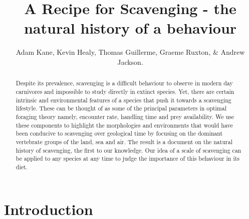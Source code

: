 \documentclass[a4paper,12pt]{article}
\title{A Recipe for Scavenging - the natural history of a behaviour}
\author{Adam Kane, Kevin Healy, Thomas Guillerme, Graeme Ruxton, \& Andrew Jackson.}
\begin{document}
\maketitle


\begin{abstract} 
Despite its prevalence, scavenging is a difficult behaviour to observe in modern day carnivores and impossible to study directly in extinct species. 
Yet, there are certain intrinsic and environmental features of a species that push it towards a scavenging lifestyle. 
These can be thought of as some of the principal parameters in optimal foraging theory namely, encounter rate, handling time and prey availability. 
We use these components to highlight the morphologies and environments that would have been conducive to scavenging over geological time by focusing on the dominant vertebrate groups of the land, sea and air. 
The result is a document on the natural history of scavenging, the first to our knowledge. 
Our idea of a scale of scavenging can be applied to any species at any time to judge the importance of this behaviour in its diet. 
\end{abstract}

\newpage


\section*{Introduction}
\end{document}
